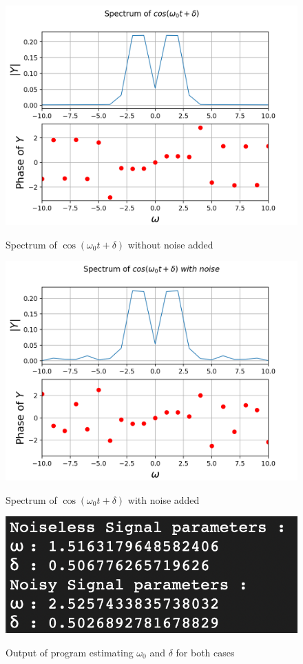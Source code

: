 \documentclass[11pt, a4paper]{article}
\begin{document}
\begin{figure}[H]
   	\centering
   	\includegraphics[scale=0.8]{qn4_wn.png}
   	\label{fig:qn4_wn}
   	\caption{Spectrum of $\cos(\omega_{0} t + \delta)$ without noise added}
\end{figure}
\begin{figure}[H]
   	\centering
   	\includegraphics[scale=0.8]{qn4_n.png}
   	\label{fig:qn4_n}
   	\caption{Spectrum of $\cos(\omega_{0} t + \delta)$ with noise added}
\end{figure}
\begin{figure}[H]
   	\centering
   	\includegraphics[scale=0.6]{out.png}
   	\label{fig:out}
   	\caption{Output of program estimating $\omega_{0}$ and $\delta$ for both cases}
\end{figure}
\end{document}
